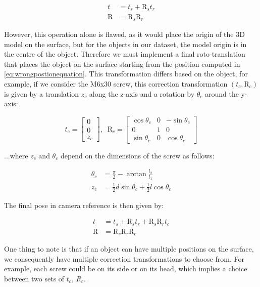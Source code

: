 \begin{align}
    t &= t_s + \text{R}_s t_r \label{eq:wrongpostionequation} \\
    \text{R} &= \text{R}_s \text{R}_r \nonumber
\end{align}

However, this operation alone is flawed, as it would place the origin of the 3D model on the surface, but for the objects in our dataset, the model origin is in the centre of the object. Therefore we must implement a final roto-translation that places the object on the surface starting from the position computed in \ref*{eq:wrongpostionequation}. This transformation differs based on the object, for example, if we consider the M6x30 screw, this correction transformation $(t_c, \text{R}_c)$ is given by a translation $z_c$ along the z-axis and a rotation by $\theta_c$ around the y-axis:

\begin{equation*}
    t_c = 
    \begin{bmatrix}
        0\\0\\z_c
    \end{bmatrix}
    ,\; \; \text{R}_c =
    \begin{bmatrix}
        \cos \theta_c & 0 & -\sin \theta_c\\
        0 & 1 & 0\\
        \sin \theta_c & 0 &  \cos \theta_c
    \end{bmatrix}
\end{equation*}

...where $z_c$ and $\theta_c$ depend on the dimensions of the screw as follows:

\begin{align*}
    \theta_c &= \frac{\pi}{2} - \arctan \frac{l_2}{l_1}\\
    z_c &= \frac{1}{2}d \sin \theta_c + \frac{1}{2} l \cos \theta_c
\end{align*}

The final pose in camera reference is then given by:

\begin{align*}
    t &= t_s + \text{R}_s t_r + \text{R}_s \text{R}_r t_c\\
    \text{R} &= \text{R}_s \text{R}_r \text{R}_c
\end{align*}

One thing to note is that if an object can have multiple positions on the surface, we consequently have multiple correction transformations to choose from. For example, each screw could be on its side or on its head, which implies a choice between two sets of $t_c$, $R_c$.

